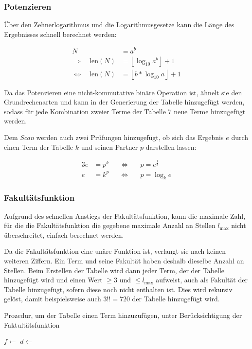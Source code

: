 \documentclass[a4paper,10pt,ngerman]{scrartcl}
\begin{document}
\subsubsection{Potenzieren}
Über den Zehnerlogarithmus und die Logarithmusgesetze kann die Länge des Ergebnisses schnell berechnet werden:

\begin{align*}
  N &= a^b \\
  \Rightarrow \quad \mathrm{len}(N) &= \left \lfloor \log_{10}a^b \right \rfloor + 1\\
  \Leftrightarrow \quad \mathrm{len}(N) &= \left \lfloor b * \log_{10}a \right \rfloor + 1
\end{align*}

Da das Potenzieren eine nicht-kommutative binäre Operation ist, ähnelt sie den Grundrechenarten und kann in der Generierung der Tabelle hinzugefügt werden, sodass für jede Kombination zweier Terme der Tabelle 7 neue Terme hinzugefügt werden.

Dem \textit{Scan} werden auch zwei Prüfungen hinzugefügt, ob sich das Ergebnis $e$ durch einen Term der Tabelle $k$ und seinen Partner $p$ darstellen lassen:

\begin{alignat*}{3}
  e &= p ^ k \quad &\Leftrightarrow& \quad p = e ^ {\frac{1}{k}} \\
  e &= k ^ p \quad &\Leftrightarrow& \quad p = \log_k e
\end{alignat*}

\subsubsection{Fakultätsfunktion}
Aufgrund des schnellen Anstiegs der Fakultätsfunktion, kann die maximale Zahl, für die die Fa\-kul\-täts\-funk\-tion die gegebene maximale Anzahl an Stellen $l_{\mathrm{max}}$ nicht überschreitet, einfach berechnet werden.

Da die Fakultätsfunktion eine unäre Funktion ist, verlangt sie nach keinen weiteren Ziffern.
Ein Term und seine Fakultät haben deshalb dieselbe Anzahl an Stellen.
Beim Erstellen der Tabelle wird dann jeder Term, der der Tabelle hinzugefügt wird und einen Wert $\geq 3$ und $\leq l_{\mathrm{max}}$ aufweist, auch als Fakultät der Tabelle hinzugefügt, sofern diese noch nicht enthalten ist.
Dies wird rekursiv gelöst, damit beispielsweise auch $3!! = 720$ der Tabelle hinzugefügt wird.

\begin{algorithm}
  \caption{Prozedur, um der Tabelle einen Term hinzuzufügen, unter Berücksichtigung der Faktultätsfunktion}
  \begin{algorithmic}[1]
        \State $f \gets $ 
        \State {}
      \EndIf
      \State $d \gets$ 
        \State {}
      \EndIf
    \EndProcedure
  \end{algorithmic}
  
\end{algorithm}
\end{document}
